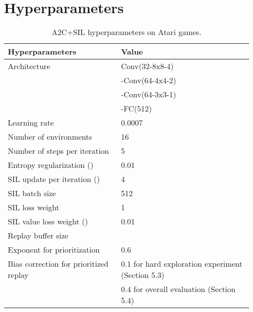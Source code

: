 \documentclass{article}
\begin{document}
\section{Hyperparameters}




\begin{table}[H]
\small
\centering
\caption{A2C+SIL hyperparameters on Atari games.}
\label{tab:hyper-a2c}
\begin{tabular}{l l}
\toprule
Hyperparameters & Value \\
\midrule
Architecture & Conv(32-8x8-4)\\
& -Conv(64-4x4-2)\\
& -Conv(64-3x3-1) \\
& -FC(512) \\
Learning rate & 0.0007 \\
Number of environments & 16 \\
Number of steps per iteration & 5 \\
Entropy regularization () & 0.01 \\
\midrule
SIL update per iteration () & 4 \\
SIL batch size & 512 \\
SIL loss weight & 1 \\
SIL value loss weight () & 0.01 \\
Replay buffer size &  \\
Exponent for prioritization & 0.6 \\
Bias correction for prioritized replay & 0.1 for hard exploration experiment (Section 5.3) \\
& 0.4 for overall evaluation (Section 5.4) \\
\bottomrule
\end{tabular}
\end{table}
\end{document}
